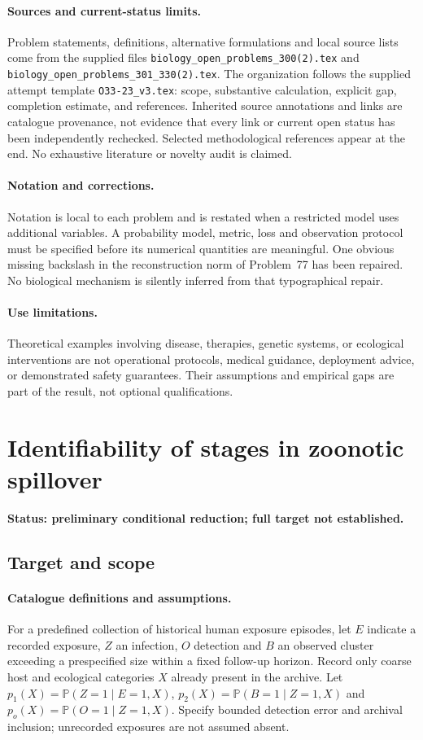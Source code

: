 \documentclass[11pt]{article}
\begin{document}
\paragraph{Sources and current-status limits.}
Problem statements, definitions, alternative formulations and local source lists
come from the supplied files
\texttt{biology\_open\_problems\_300(2).tex} and
\texttt{biology\_open\_problems\_301\_330(2).tex}.
The organization follows the supplied attempt template
\texttt{O33-23\_v3.tex}: scope, substantive calculation, explicit gap,
completion estimate, and references. Inherited source annotations and links are
catalogue provenance, not evidence that every link or current open status has
been independently rechecked. Selected methodological references appear at the
end. No exhaustive literature or novelty audit is claimed.

\paragraph{Notation and corrections.}
Notation is local to each problem and is restated when a restricted model uses
additional variables. A probability model, metric, loss and observation protocol
must be specified before its numerical quantities are meaningful. One obvious
missing backslash in the reconstruction norm of Problem~77 has been repaired.
No biological mechanism is silently inferred from that typographical repair.

\paragraph{Use limitations.}
Theoretical examples involving disease, therapies, genetic systems, or ecological
interventions are not operational protocols, medical guidance, deployment advice,
or demonstrated safety guarantees. Their assumptions and empirical gaps are part
of the result, not optional qualifications.


\section*{Identifiability of stages in zoonotic spillover}
\label{prob:209}
\noindent\textbf{Status: preliminary conditional reduction; full target not established.}
\subsection{Target and scope}
\paragraph{Catalogue definitions and assumptions.}
For a predefined collection of historical human exposure episodes, let $E$ indicate a recorded exposure, $Z$ an infection, $O$ detection and $B$ an observed cluster exceeding a prespecified size within a fixed follow-up horizon. Record only coarse host and ecological categories $X$ already present in the archive. Let $p_1(X)=\mathbb{P}(Z=1\mid E=1,X)$, $p_2(X)=\mathbb{P}(B=1\mid Z=1,X)$ and $p_o(X)=\mathbb{P}(O=1\mid Z=1,X)$. Specify bounded detection error and archival inclusion; unrecorded exposures are not assumed absent.
\end{document}
